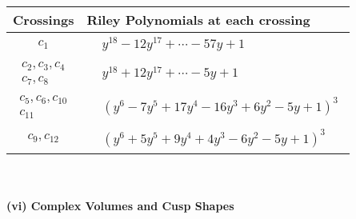\documentclass[1p]{elsarticle_modified}
\theoremstyle{definition}
\begin{document}
\begin{tabular}{m{50pt}|m{274pt}}
Crossings & \hspace{64pt}Riley Polynomials at each crossing \\
\hline $$\begin{aligned}c_{1}\end{aligned}$$&$\begin{aligned}
&y^{18}-12 y^{17}+\cdots-57 y+1
\end{aligned}$\\
\hline $$\begin{aligned}c_{2},c_{3},c_{4}\\c_{7},c_{8}\end{aligned}$$&$\begin{aligned}
&y^{18}+12 y^{17}+\cdots-5 y+1
\end{aligned}$\\
\hline $$\begin{aligned}c_{5},c_{6},c_{10}\\c_{11}\end{aligned}$$&$\begin{aligned}
&(y^6-7 y^5+17 y^4-16 y^3+6 y^2-5 y+1)^3
\end{aligned}$\\
\hline $$\begin{aligned}c_{9},c_{12}\end{aligned}$$&$\begin{aligned}
&(y^6+5 y^5+9 y^4+4 y^3-6 y^2-5 y+1)^3
\end{aligned}$\\
\hline
\end{tabular}\\~\\
\newpage\flushleft \textbf{(vi) Complex Volumes and Cusp Shapes}
\end{document}
